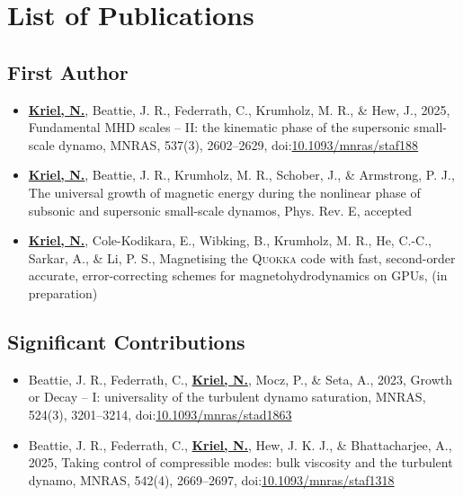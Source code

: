 \chapter*{List of Publications}
\vspace{-0.5cm}

\section*{First Author}

\begin{itemize}
  \item \underline{\textbf{Kriel, N.}}, Beattie, J. R., Federrath, C., Krumholz, M. R., \& Hew, J., 2025,
  Fundamental MHD scales -- II: the kinematic phase of the supersonic small-scale dynamo,
  MNRAS, 537(3), 2602–2629, doi:\href{https://doi.org/10.1093/mnras/staf188}{10.1093/mnras/staf188}

  \item \underline{\textbf{Kriel, N.}}, Beattie, J. R., Krumholz, M. R., Schober, J., \& Armstrong, P. J.,
  The universal growth of magnetic energy during the nonlinear phase of subsonic and supersonic small-scale dynamos,
  Phys. Rev. E, accepted

  \item \underline{\textbf{Kriel, N.}}, Cole-Kodikara, E., Wibking, B., Krumholz, M. R., He, C.-C., Sarkar, A., \& Li, P. S.,
  Magnetising the \textsc{Quokka} code with fast, second-order accurate, error-correcting schemes for magnetohydrodynamics on GPUs,
  (in preparation)
\end{itemize}

\section*{Significant Contributions}

\begin{itemize}
  \item Beattie, J. R., Federrath, C., \underline{\textbf{Kriel, N.}}, Mocz, P., \& Seta, A., 2023,
  Growth or Decay -- I: universality of the turbulent dynamo saturation,
  MNRAS, 524(3), 3201–3214, doi:\href{https://doi.org/10.1093/mnras/stad1863}{10.1093/mnras/stad1863}

  \item Beattie, J. R., Federrath, C., \underline{\textbf{Kriel, N.}}, Hew, J. K. J., \& Bhattacharjee, A., 2025,
  Taking control of compressible modes: bulk viscosity and the turbulent dynamo,
  MNRAS, 542(4), 2669–2697, doi:\href{https://doi.org/10.1093/mnras/staf1318}{10.1093/mnras/staf1318}
\end{itemize}

